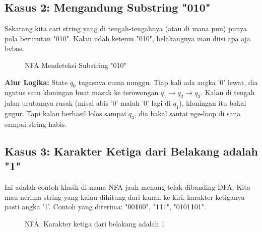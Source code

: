 \documentclass[12pt,a4paper]{article}
\begin{document}
\subsection{Kasus 2: Mengandung Substring "010"}
Sekarang kita cari string yang di tengah-tengahnya (atau di mana pun) punya pola berurutan "010". Kalau udah ketemu "010", belakangnya mau diisi apa aja bebas.

\begin{figure}[h]
    \centering
    \caption{NFA Mendeteksi Substring "010"}
\end{figure}

\textbf{Alur Logika:}
State $q_0$ tugasnya cuma nunggu. Tiap kali ada angka '0' lewat, dia ngutus satu kloningan buat masuk ke terowongan $q_1 \rightarrow q_2 \rightarrow q_3$. Kalau di tengah jalan urutannya rusak (misal abis '0' malah '0' lagi di $q_1$), kloningan itu bakal gugur. Tapi kalau berhasil lolos sampai $q_3$, dia bakal santai nge-loop di sana sampai string habis.

\subsection{Kasus 3: Karakter Ketiga dari Belakang adalah "1"}
Ini adalah contoh klasik di mana NFA jauh menang telak dibanding DFA. Kita mau nerima string yang kalau dihitung dari kanan ke kiri, karakter ketiganya pasti angka '1'.
Contoh yang diterima: "00\textbf{1}00", "\textbf{1}11", "0101\textbf{1}01".

\begin{figure}[h]
    \centering
    \caption{NFA: Karakter ketiga dari belakang adalah 1}
\end{figure}
\end{document}
